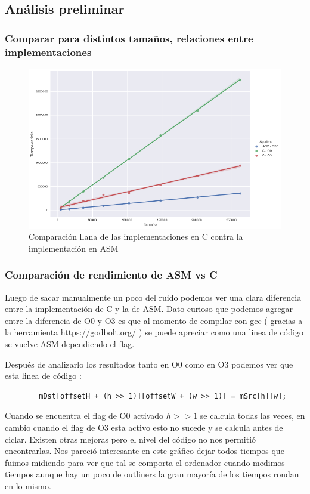 \subsection{Análisis preliminar}
\subsubsection*{Comparar para distintos tamaños, relaciones entre implementaciones}
\begin{figure}[H]
\centering
\includegraphics[scale=0.5]{img/fourCombine_CvsASMvsO3.png}
\caption{Comparación llana de las implementaciones en C contra la implementación en ASM}
\label{sec:ticksciclo}
\end{figure}
\subsubsection*{Comparación de rendimiento de ASM vs C}
Luego de sacar manualmente un poco del ruido podemos ver una clara diferencia entre la implementación de C y la de ASM. Dato curioso que podemos agregar entre la diferencia de O0 y O3 es que al momento de compilar con gcc ( gracias a la herramienta \url{https://godbolt.org/} ) se puede apreciar como una linea de código se vuelve ASM dependiendo el flag. 

Después de analizarlo los resultados tanto en O0 como en O3 podemos ver que esta linea de código :

\begin{lstlisting}
		mDst[offsetH + (h >> 1)][offsetW + (w >> 1)] = mSrc[h][w];
\end{lstlisting}

Cuando se encuentra el flag de O0 activado $h >> 1$ se calcula todas las veces, en cambio cuando el flag de O3 esta activo esto no sucede y se calcula antes de ciclar. Existen otras mejoras pero el nivel del código no nos permitió encontrarlas. Nos pareció interesante en este gráfico dejar todos tiempos que fuimos midiendo para ver que tal se comporta el ordenador cuando medimos tiempos aunque hay un poco de outliners la gran mayoría de los tiempos rondan en lo mismo.

